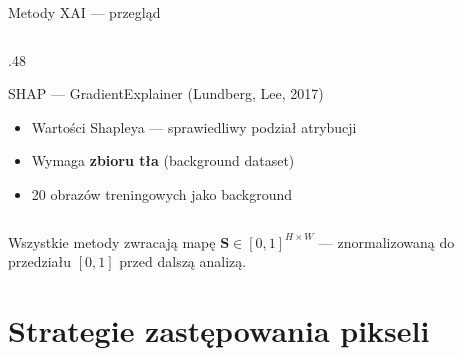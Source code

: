 \documentclass[aspectratio=169, 12pt]{beamer}
\begin{document}
\begin{frame}{Metody XAI — przegląd}
\begin{columns}[T]
\begin{column}{.48\textwidth}
      \begin{block}{SHAP — GradientExplainer \small(Lundberg, Lee, 2017)}
        \begin{itemize}
          \item Wartości Shapleya — sprawiedliwy podział atrybucji
          \item Wymaga \textbf{zbioru tła} (background dataset)
          \item 20 obrazów treningowych jako background
        \end{itemize}
      \end{block}
    \end{column}
  \end{columns}
  \vspace{6pt}
  \small
  Wszystkie metody zwracają mapę $\mathbf{S} \in [0,1]^{H \times W}$
  — znormalizowaną do przedziału $[0,1]$ przed dalszą analizą.
\end{frame}

\section{Strategie zastępowania pikseli}
\end{document}
